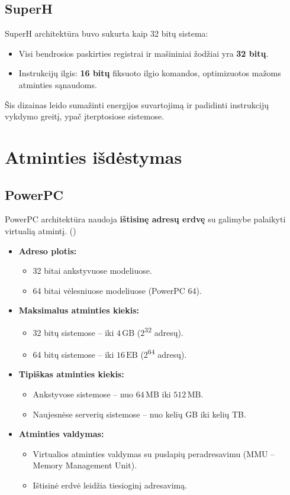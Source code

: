 \documentclass{article}
\begin{document}
\subsection{SuperH}
SuperH architektūra buvo sukurta kaip 32 bitų sistema:
\begin{itemize}
    \item Visi bendrosios paskirties registrai ir mašininiai žodžiai yra \textbf{32 bitų}.
    \item Instrukcijų ilgis: \textbf{16 bitų} fiksuoto ilgio komandos, optimizuotos mažoms atminties sąnaudoms.
\end{itemize}
Šis dizainas leido sumažinti energijos suvartojimą ir padidinti instrukcijų vykdymo greitį, ypač įterptosiose sistemose.

\section{Atminties išdėstymas}
\subsection{PowerPC}
PowerPC architektūra naudoja \textbf{ištisinę adresų erdvę} su galimybe palaikyti virtualią atmintį. (\citealp{Wikipedia2024})

\begin{itemize}
    \item \textbf{Adreso plotis:} 
        \begin{itemize}
            \item 32 bitai ankstyvuose modeliuose.
            \item 64 bitai vėlesniuose modeliuose (PowerPC 64).
        \end{itemize}
    \item \textbf{Maksimalus atminties kiekis:}
        \begin{itemize}
            \item 32 bitų sistemose – iki \( 4 \, \text{GB} \) (2\textsuperscript{32} adresų).
            \item 64 bitų sistemose – iki \( 16 \, \text{EB} \) (2\textsuperscript{64} adresų).
        \end{itemize}
    \item \textbf{Tipiškas atminties kiekis:}
        \begin{itemize}
            \item Ankstyvose sistemose – nuo \( 64 \, \text{MB} \) iki \( 512 \, \text{MB} \).
            \item Naujesnėse serverių sistemose – nuo kelių GB iki kelių TB.
        \end{itemize}
    \item \textbf{Atminties valdymas:}
        \begin{itemize}
            \item Virtualios atminties valdymas su puslapių peradresavimu (MMU – Memory Management Unit).
            \item Ištisinė erdvė leidžia tiesioginį adresavimą.
        \end{itemize}
\end{itemize}
\end{document}
